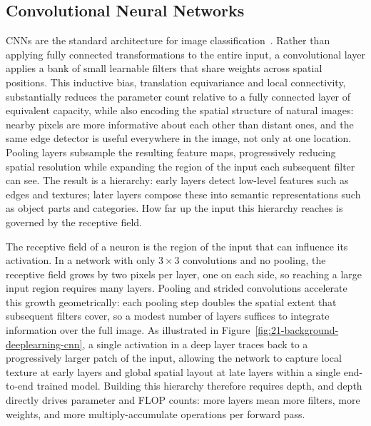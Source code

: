 \documentclass[12pt, a4paper, twoside]{book}
\numberwithin{equation}{chapter}
\theoremstyle{plain}
\theoremstyle{definition}
\theoremstyle{remark}
\newenvironment{foldable}{}{}
\begin{document}
\subsection{Convolutional Neural Networks} \label{sec:21-background-deeplearning-cnn}
\begin{foldable}
  \Acp{CNN} are the standard architecture for image classification~\cite{lecun1998gradient}.
  Rather than applying fully connected transformations to the entire input, a convolutional layer applies a bank of small learnable filters that share weights across spatial positions.
  This inductive bias, translation equivariance and local connectivity, substantially reduces the parameter count relative to a fully connected layer of equivalent capacity, while also encoding the spatial structure of natural images: nearby pixels are more informative about each other than distant ones, and the same edge detector is useful everywhere in the image, not only at one location.
  Pooling layers subsample the resulting feature maps, progressively reducing spatial resolution while expanding the region of the input each subsequent filter can see.
  The result is a hierarchy: early layers detect low-level features such as edges and textures; later layers compose these into semantic representations such as object parts and categories.
  How far up the input this hierarchy reaches is governed by the receptive field.
\end{foldable}

\begin{foldable}
  The receptive field of a neuron is the region of the input that can influence its activation.
  In a network with only $3\times3$ convolutions and no pooling, the receptive field grows by two pixels per layer, one on each side, so reaching a large input region requires many layers.
  Pooling and strided convolutions accelerate this growth geometrically: each pooling step doubles the spatial extent that subsequent filters cover, so a modest number of layers suffices to integrate information over the full image.
  As illustrated in Figure~\ref{fig:21-background-deeplearning-cnn}, a single activation in a deep layer traces back to a progressively larger patch of the input, allowing the network to capture local texture at early layers and global spatial layout at late layers within a single end-to-end trained model.
  Building this hierarchy therefore requires depth, and depth directly drives parameter and \ac{FLOP} counts: more layers mean more filters, more weights, and more multiply-accumulate operations per forward pass.
\end{foldable}
\end{document}
